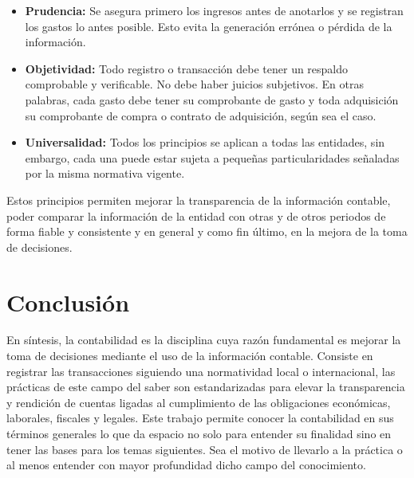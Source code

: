 \documentclass[letterpaper, 12pt]{article}
\begin{document}
\begin{itemize}
		\item \textbf{Prudencia:} Se asegura primero los ingresos antes de anotarlos y se registran los gastos lo antes posible. Esto evita la generación errónea o pérdida de la información.
		\item \textbf{Objetividad:} Todo registro o transacción debe tener un respaldo comprobable y verificable. No debe haber juicios subjetivos. En otras palabras, cada gasto debe tener su comprobante de gasto y toda adquisición su comprobante de compra o contrato de adquisición, según sea el caso.
		\item \textbf{Universalidad:} Todos los principios se aplican a todas las entidades, sin embargo, cada una puede estar sujeta a pequeñas particularidades señaladas por la misma normativa vigente.

		\end{itemize}
	
		Estos principios permiten mejorar la transparencia de la información contable, poder comparar la información de la entidad con otras y de otros periodos de forma fiable y consistente y en general y como fin último, en la mejora de la toma de decisiones.
	
	\section*{Conclusión}
	
		En síntesis, la contabilidad es la disciplina cuya razón fundamental es mejorar la toma de decisiones mediante el uso de la información contable. Consiste en registrar las transacciones siguiendo una normatividad local o internacional, las prácticas de este campo del saber son estandarizadas para elevar la transparencia y rendición de cuentas ligadas al cumplimiento de las obligaciones económicas, laborales, fiscales y legales. Este trabajo permite conocer la contabilidad en sus términos generales lo que da espacio no solo para entender su finalidad sino en tener las bases para los temas siguientes. Sea el motivo de llevarlo a la práctica o al menos entender con mayor profundidad dicho campo del conocimiento.
\end{document}
